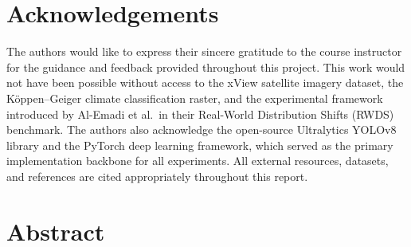 \documentclass[12pt,a4paper]{article}
\begin{document}
\newpage

\section*{Acknowledgements}

The authors would like to express their sincere gratitude to the course instructor for the guidance and feedback provided throughout this project. This work would not have been possible without access to the xView satellite imagery dataset, the K\"{o}ppen--Geiger climate classification raster, and the experimental framework introduced by Al-Emadi et al.\ in their Real-World Distribution Shifts (RWDS) benchmark. The authors also acknowledge the open-source Ultralytics YOLOv8 library and the PyTorch deep learning framework, which served as the primary implementation backbone for all experiments. All external resources, datasets, and references are cited appropriately throughout this report.

\newpage

\tableofcontents
\newpage

\section*{Abstract}
\end{document}

